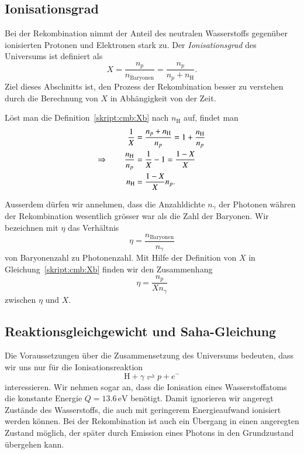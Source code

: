 \subsection{Ionisationsgrad}
Bei der Rekombination nimmt der Anteil des neutralen Wasserstoffs
gegenüber ionisierten Protonen und Elektronen stark zu.
Der {\em Ionisationsgrad} des Universums ist  definiert als
%
\begin{equation}
X=\frac{n_p}{n_\text{Baryonen}}=\frac{n_p}{n_p+n_\text{H}}.
\label{skript:cmb:Xb}
\end{equation}
Ziel dieses Abschnitts ist, den Prozess der Rekombination besser zu
verstehen durch die Berechnung von $X$ in Abhängigkeit 
von der Zeit.

Löst man die Definition~\eqref{skript:cmb:Xb} nach $n_\text{H}$ auf,
findet man
\begin{align}
\frac1X
&=
\frac{n_p+n_\text{H}}{n_p}
=
1+
\frac{n_\text{H}}{n_p}
\notag
\\
\Rightarrow
\qquad
\frac{n_\text{H}}{n_p}
&=
\frac{1}{X}-1
=
\frac{1-X}{X}
\notag
\\
n_\text{H}
&=
\frac{1-X}{X}n_p.
\label{skript:cmb:XnH}
\end{align}

Ausserdem dürfen wir annehmen, dass die Anzahldichte $n_\gamma$
der Photonen währen der Rekombination wesentlich grösser war als
die Zahl der Baryonen.
Wir bezeichnen mit $\eta$ das Verhältnis
\[
\eta = \frac{n_\text{Baryonen}}{n_\gamma}
\]
von Baryonenzahl zu Photonenzahl.
Mit Hilfe der Definition von $X$ in Gleichung~\eqref{skript:cmb:Xb}
finden wir den Zusammenhang
\begin{equation}
\eta = \frac{n_p}{Xn_\gamma}
\label{skript:cmb:etaX}
\end{equation}
zwischen $\eta$ und $X$.

\subsection{Reaktionsgleichgewicht und Saha-Gleichung}
Die Voraussetzungen über die Zusammensetzung des Universums bedeuten,
dass wir uns nur für die Ionisationsreaktion
\begin{equation}
\text{H} + \gamma 
\rightleftharpoons
p + e^-
\label{skript:cmb:reaktionsgleichung}
\end{equation}
interessieren.
Wir nehmen sogar an, dass die Ionisation eines Wasserstoffatoms 
die konstante Energie $Q=13.6\,\text{eV}$ benötigt.
Damit ignorieren wir angeregt Zustände des Wasserstoffs, die auch
mit geringerem Energieaufwand ionisiert werden können.
Bei der Rekombination ist auch ein Übergang in einen angeregten
Zustand möglich, der später durch Emission eines Photons in den Grundzustand
übergehen kann.

